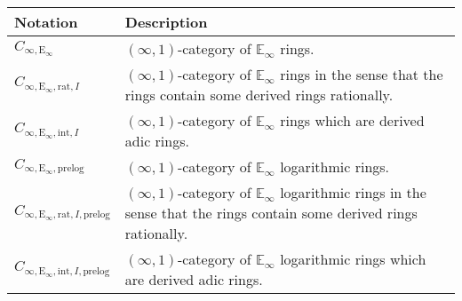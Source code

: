 \documentclass[11pt]{book}
\theoremstyle{definition}
\numberwithin{equation}{section}
\begin{document}
\begin{center}
\begin{tabularx}{\linewidth}{lX}
Notation & Description\\
\hline
$C_{\infty,\mathrm{E}_\infty}$ &$(\infty,1)$-category of $\mathbb{E}_\infty$ rings.\\
$C_{\infty,\mathrm{E}_\infty,\mathrm{rat},I}$ &$(\infty,1)$-category of $\mathbb{E}_\infty$ rings in the sense that the rings contain some derived rings rationally.\\
$C_{\infty,\mathrm{E}_\infty,\mathrm{int},I}$ &$(\infty,1)$-category of $\mathbb{E}_\infty$ rings which are derived adic rings.\\
$C_{\infty,\mathrm{E}_\infty,\text{prelog}}$ &$(\infty,1)$-category of $\mathbb{E}_\infty$ logarithmic rings.\\
$C_{\infty,\mathrm{E}_\infty,\mathrm{rat},I,\text{prelog}}$ &    $(\infty,1)$-category of $\mathbb{E}_\infty$ logarithmic rings in the sense that the rings contain some derived rings rationally.\\
$C_{\infty,\mathrm{E}_\infty,\mathrm{int},I,\text{prelog}}$ &    $(\infty,1)$-category of $\mathbb{E}_\infty$ logarithmic rings which are derived adic rings.\\


\end{tabularx}
\end{center}
\end{document}
